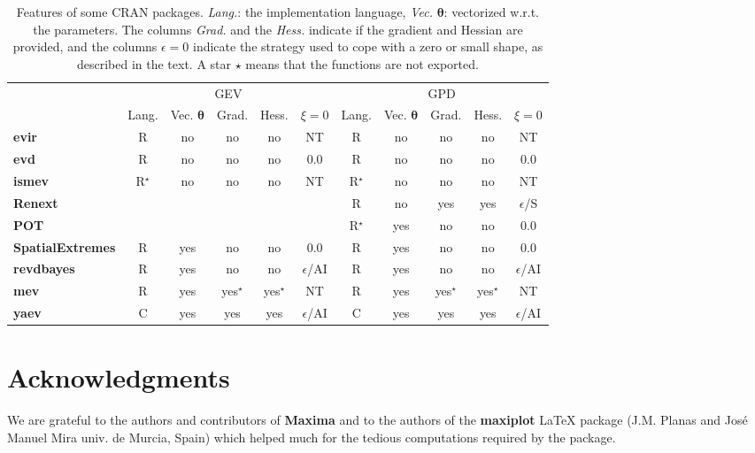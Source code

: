 \documentclass[11pt]{article}\usepackage[]{graphicx}\usepackage[]{xcolor}
\newcommand{\bs}{\boldsymbol}
\newcommand{\Gre}[1]{{\color{MonVertF}#1}}
\begin{document}
\begin{table}
    \centering \small
    \begin{tabular}{| l || c | c | c | c | c || c | c | c | c | c |}
      \hline
      \multicolumn{1}{|c||}{\raisebox{-0.3em}{Package}}
      & \multicolumn{5}{c||}{GEV}
      & \multicolumn{5}{c|}{GPD}\\ \cline{2-6} \cline{7-11}
      \multicolumn{1}{|c||}{}
      & \multicolumn{1}{c|}{Lang.}
      & \multicolumn{1}{c|}{Vec. $\bs{\theta}$}
      & \multicolumn{1}{c|}{Grad.}
      & \multicolumn{1}{c|}{Hess.}
      & \multicolumn{1}{c||}{$\xi=0$}
      & \multicolumn{1}{c|}{Lang.}
      & \multicolumn{1}{c|}{Vec. $\bs{\theta}$}
      & \multicolumn{1}{c|}{Grad.}
      & \multicolumn{1}{c|}{Hess.}
      & \multicolumn{1}{c|}{$\xi=0$} \\ \hline\hline
      \textbf{evir}
      & R & no & no & no & NT & R & no & no & no & NT\\ \hline
      \textbf{evd}
      & R & no & no & no & 0.0 & R & no & no & no & 0.0\\ \hline
      \textbf{ismev}
      & R$^\star$ & no & no & no & NT & R$^\star$ & no & no & no & NT\\ \hline
      \textbf{Renext}
      &  &  &  &  &  & R & no & yes & yes & $\epsilon$/S \\ \hline
      \textbf{POT}
      &  &  &  &  &  & R$^\star$ & yes & no & no & 0.0 \\ \hline
      \textbf{SpatialExtremes}
      & R  & yes & no & no & $0.0$ & R & yes & no & no & $0.0$ \\ \hline   
      \textbf{revdbayes}
      & R  & yes & no & no & $\epsilon$/AI & R & yes & no & no & $\epsilon$/AI \\ \hline
      \textbf{mev}
      & R  & yes & yes$^\star$ & yes$^\star$& NT & R & yes & yes$^\star$
      & yes$^\star$ & NT \\ \hline
      \Gre{\textbf{yaev}}
      & \Gre{C} & \Gre{yes} & \Gre{yes} & \Gre{yes} & \Gre{$\epsilon$/AI}   
      & \Gre{C} & \Gre{yes} & \Gre{yes} & \Gre{yes} & \Gre{$\epsilon$/AI} \\
      \hline
    \end{tabular}
    \caption{\label{TabXi}\small \sf Features of some CRAN
      packages. \textit{Lang.}: the implementation language,
      \textit{Vec.}  $\bs{\theta}$: vectorized w.r.t. the
      parameters. The columns \textit{Grad.} and the \textit{Hess.}
      indicate if the gradient and Hessian are provided, and the
      columns $\epsilon = 0$ indicate the strategy used to cope with a
      zero or small shape, as described in the text. A star $\star$
      means that the functions are not exported.}
  \end{table}


\section*{Acknowledgments}

We are grateful to the authors and contributors of \textbf{Maxima} and
to the authors of the \textbf{maxiplot} \LaTeX{} package (J.M. Planas
and José Manuel Mira univ. de Murcia, Spain) which helped much for the
tedious computations required by the package.
\end{document}
